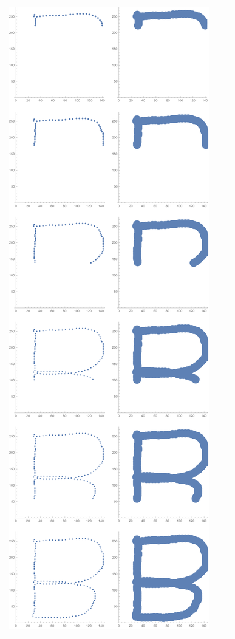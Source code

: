 \documentclass{article}
\begin{document}
\begin{tabular}{c c c}
	\includegraphics[scale=0.2]{../images/RT-B-cuts.pdf}
	&

\end{tabular}
\end{document}
